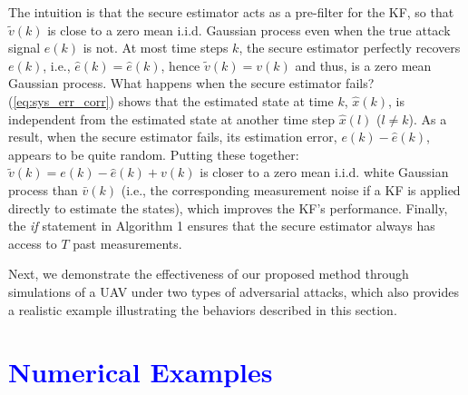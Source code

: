 \documentclass[12pt, conference, a4paper, twoside]{IEEEconf_mod}
\begin{document}
The intuition is that the secure estimator acts as a pre-filter for the KF, so that $\tilde v(k)$ is close to a zero mean i.i.d. Gaussian process even when the true attack signal $e(k)$ is not. 
At most time steps $k$, the secure estimator perfectly recovers $e(k)$, i.e., $\hat e(k) = \hat e(k)$, hence $\tilde v(k) = v(k)$ and thus, is a zero mean Gaussian process. What happens when the secure estimator fails? (\ref{eq:sys_err_corr}) shows that the estimated state at time $k$, $\hat x(k)$, is independent from the estimated state at another time step $\hat x(l)$ ($l \neq k$). 
As a result, when the secure estimator fails, its estimation error, $e(k) - \hat e(k)$, appears to be quite random. 
Putting these together: $\tilde v(k) = e(k) - \hat e(k) + v(k)$ is closer to a zero mean i.i.d. white Gaussian process than $\bar v(k)$ (i.e., the corresponding measurement noise if a KF is applied directly to estimate the states), which improves the KF's performance. 
Finally, the \textit{if} statement in Algorithm 1 ensures that the secure estimator always has access to $T$ past measurements.

Next, we demonstrate the effectiveness of our proposed method through simulations of a UAV under two types of adversarial attacks, which also provides a realistic example illustrating the behaviors described in this section.



\vspace{3mm}
\section{\textcolor{blue}{Numerical Examples}}
\end{document}
